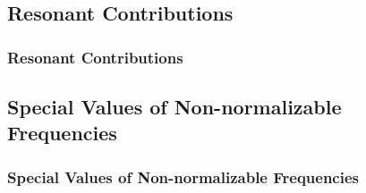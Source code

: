 \documentclass[mathserif,10pt]{beamer}
\begin{document}

\subsection{Resonant Contributions}
\frame
{
  \frametitle{Resonant Contributions}
}


\subsection{Special Values of Non-normalizable Frequencies}
\frame
{
  \frametitle{Special Values of Non-normalizable Frequencies}
}

\end{document}

